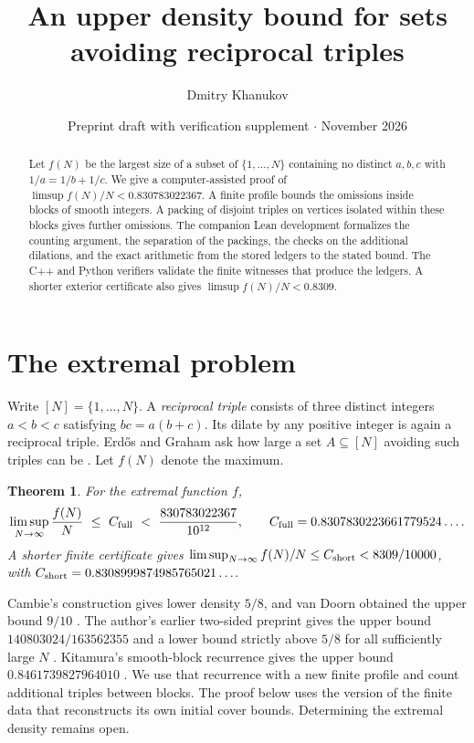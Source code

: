 \documentclass[11pt,letterpaper]{article}
\title{\bfseries An upper density bound for sets\\avoiding reciprocal triples}
\author{Dmitry Khanukov}
\date{Preprint draft with verification supplement \enspace$\cdot$\enspace 20 November 2026}
\newtheorem{theorem}{Theorem}
\theoremstyle{definition}
\newcommand{\cshort}{C_{\rm short}}
\newcommand{\cfull}{C_{\rm full}}
\begin{document}
\maketitle
\begin{abstract}
Let $f(N)$ be the largest size of a subset of $\{1,\ldots,N\}$ containing
no distinct $a,b,c$ with $1/a=1/b+1/c$. We give a computer-assisted proof of
$\limsup f(N)/N<0.830783022367$. A finite profile bounds the omissions
inside blocks of smooth integers. A packing of disjoint triples on
vertices isolated within these blocks gives further omissions. The
companion Lean development formalizes the counting argument, the
separation of the packings, the checks on the additional dilations,
and the exact arithmetic from the stored ledgers to the stated bound.
The C++ and Python verifiers validate the finite witnesses that
produce the ledgers. A shorter exterior certificate also gives
$\limsup f(N)/N<0.8309$.
\end{abstract}

\section{The extremal problem}
Write $[N]=\{1,\ldots,N\}$. A \emph{reciprocal triple} consists of
three distinct integers $a<b<c$ satisfying $bc=a(b+c)$. Its dilate by
any positive integer is again a reciprocal triple. Erd\H{o}s and
Graham ask how large a set $A\subseteq[N]$ avoiding such triples can
be \cite{EG,Bloom}. Let $f(N)$ denote the maximum.

\begin{theorem}\label{thm:main}
For the extremal function $f$,
\[
  \limsup_{N\to\infty}\frac{f(N)}N
    \ \le\ \cfull\ <\ \frac{830783022367}{10^{12}},\qquad
  \cfull=0.8307830223661779524\ldots .
\]
A shorter finite certificate gives
$\limsup_{N\to\infty}f(N)/N\le\cshort<8309/10000$, with
$\cshort=0.8308999874985765021\ldots$.
\end{theorem}

Cambie's construction gives lower density $5/8$, and van Doorn obtained
the upper bound $9/10$ \cite{Bloom}. The author's earlier two-sided
preprint gives the upper bound $140803024/163562355$ and a lower
bound strictly above $5/8$ for all sufficiently large $N$
\cite{Khanukov}. Kitamura's smooth-block recurrence gives the upper
bound $0.8461739827964010$ \cite{Kitamura}. We use that recurrence
with a new finite profile and count additional triples between blocks.
The proof below uses the version of the finite data that reconstructs
its own initial cover bounds. Determining the extremal density remains open.
\end{document}
